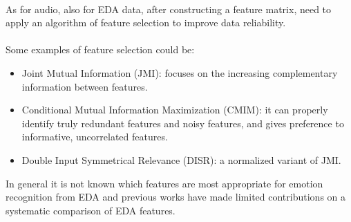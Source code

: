 \\ \indent
As for audio, also for EDA data, after constructing a feature matrix, need to apply an algorithm of feature selection to improve data reliability.
\\ \\
Some examples of feature selection could be:
\begin{itemize}
	\item Joint Mutual Information (JMI): focuses on the increasing complementary information between features.
	\item Conditional Mutual Information Maximization (CMIM): it can properly identify truly redundant features and noisy features, and gives preference to informative, uncorrelated features.
	\item Double Input Symmetrical Relevance (DISR): a normalized variant of JMI.
\end{itemize}
In general it is not known which features are most appropriate for emotion recognition from EDA and previous works have made limited contributions on a systematic comparison of EDA features. 







